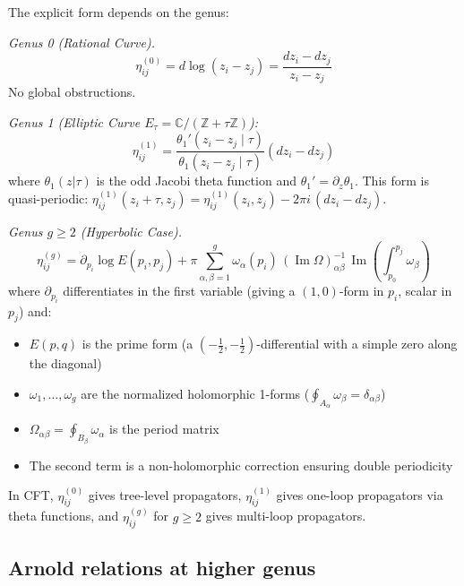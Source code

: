 The explicit form depends on the genus:

\emph{Genus 0 (Rational Curve).}
\begin{equation}
\eta_{ij}^{(0)} = d\log(z_i - z_j) = \frac{dz_i - dz_j}{z_i - z_j}
\end{equation}
No global obstructions.

\emph{Genus 1 (Elliptic Curve $E_\tau = \mathbb{C}/(\mathbb{Z} + \tau\mathbb{Z})$):}
\begin{equation}
\eta_{ij}^{(1)} = \frac{\theta_1'(z_i - z_j \mid \tau)}{\theta_1(z_i - z_j \mid \tau)}(dz_i - dz_j)
\end{equation}
where $\theta_1(z|\tau)$ is the odd Jacobi theta function and $\theta_1' = \partial_z \theta_1$.  This form is quasi-periodic: $\eta_{ij}^{(1)}(z_i + \tau, z_j) = \eta_{ij}^{(1)}(z_i, z_j) - 2\pi i\,(dz_i - dz_j)$.

\emph{Genus $g \geq 2$ (Hyperbolic Case).}
\begin{equation}
\eta_{ij}^{(g)} = \partial_{p_i}\log E(p_i, p_j) + \pi\sum_{\alpha, \beta = 1}^g \omega_\alpha(p_i) \,(\operatorname{Im}\Omega)_{\alpha\beta}^{-1}\, \operatorname{Im}\!\left(\int_{p_0}^{p_j}\omega_\beta\right)
\end{equation}
where $\partial_{p_i}$ differentiates in the first variable (giving a $(1,0)$-form in $p_i$, scalar in $p_j$) and:
\begin{itemize}
\item $E(p, q)$ is the prime form (a $(-\frac{1}{2}, -\frac{1}{2})$-differential with a simple zero along the diagonal)
\item $\omega_1, \ldots, \omega_g$ are the normalized holomorphic 1-forms ($\oint_{A_\alpha}\omega_\beta = \delta_{\alpha\beta}$)
\item $\Omega_{\alpha\beta} = \oint_{B_\beta} \omega_\alpha$ is the period matrix
\item The second term is a non-holomorphic correction ensuring double periodicity
\end{itemize}

\begin{remark}
\label{rem:physical-log-forms}
In CFT, $\eta_{ij}^{(0)}$ gives tree-level propagators, $\eta_{ij}^{(1)}$ gives one-loop propagators via theta functions, and $\eta_{ij}^{(g)}$ for $g \geq 2$ gives multi-loop propagators.
\end{remark}

\subsection{Arnold relations at higher genus}

